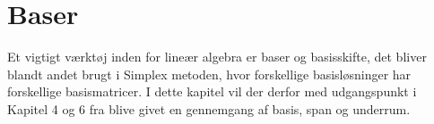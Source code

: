 \chapter{Baser}
Et vigtigt værktøj inden for lineær algebra er baser og basisskifte, det bliver blandt andet brugt i Simplex metoden, hvor forskellige basisløsninger har forskellige basismatricer. 
I dette kapitel vil der derfor med udgangspunkt i Kapitel 4 og 6 fra \citet{lial}
blive givet en gennemgang af basis, span og underrum. \\






